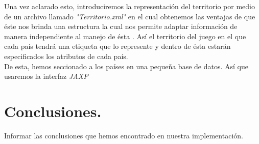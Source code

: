 \documentclass[12pt,twocolumn,draft]{article}
\begin{document}
Una vez aclarado esto, introduciremos la representaci\'on del territorio por medio de un archivo llamado \textit{"Territorio.xml"} en el cual obtenemos las ventajas de que \'este nos brinda una estructura la cual nos permite adaptar informaci\'on de manera independiente al manejo de \'esta \cite{xml}. As\'i el territorio del juego en el que cada pa\'is tendr\'a una etiqueta que lo represente y dentro de \'esta estar\'an especificados los atributos de cada pa\'is.\\

De esta, hemos seccionado a los pa\'ises en una pequeña base de datos. As\'i que usaremos la interfaz \textit{JAXP}\cite{JAXP}

\section{Conclusiones.}
Informar las conclusiones que hemos encontrado en nuestra implementaci\'on.\\


\newpage
	
{}
\end{document}
